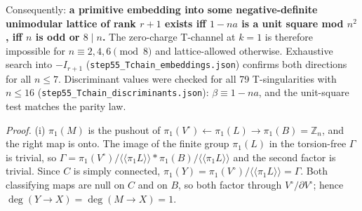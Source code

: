 \documentclass[
  10pt,
]{report}
\begin{document}
Consequently: \textbf{a primitive embedding into some negative-definite
unimodular lattice of rank \(r+1\) exists iff \(1-na\) is a unit square
mod \(n^2\), iff \(n\) is odd or \(8\mid n\).} The zero-charge T-channel
at \(k=1\) is therefore impossible for \(n\equiv2,4,6\pmod 8\) and
lattice-allowed otherwise. Exhaustive search into \(-I_{r+1}\)
(\texttt{step55\_Tchain\_embeddings.json}) confirms both directions for
all \(n\le7\). Discriminant values were checked for all 79
T-singularities with \(n\le16\)
(\texttt{step55\_Tchain\_discriminants.json}): \(\beta\equiv1-na\), and
the unit-square test matches the parity law.

\emph{Proof.} (i) \(\pi_1(M)\) is the pushout of
\(\pi_1(V^\circ)\leftarrow\pi_1(L)\to\pi_1(B)=\mathbb Z_n\), and the
right map is onto. The image of the finite group \(\pi_1(L)\) in the
torsion-free \(\Gamma\) is trivial, so
\(\Gamma=\pi_1(V^\circ)/\langle\!\langle\pi_1L\rangle\!\rangle*\pi_1(B)/\langle\!\langle\pi_1L\rangle\!\rangle\)
and the second factor is trivial. Since \(C\) is simply connected,
\(\pi_1(Y)=\pi_1(V^\circ)/\langle\!\langle\pi_1L\rangle\!\rangle=\Gamma\).
Both classifying maps are null on \(C\) and on \(B\), so both factor
through \(V^\circ/\partial V^\circ\); hence
\(\deg(Y\to X)=\deg(M\to X)=1\).
\end{document}
